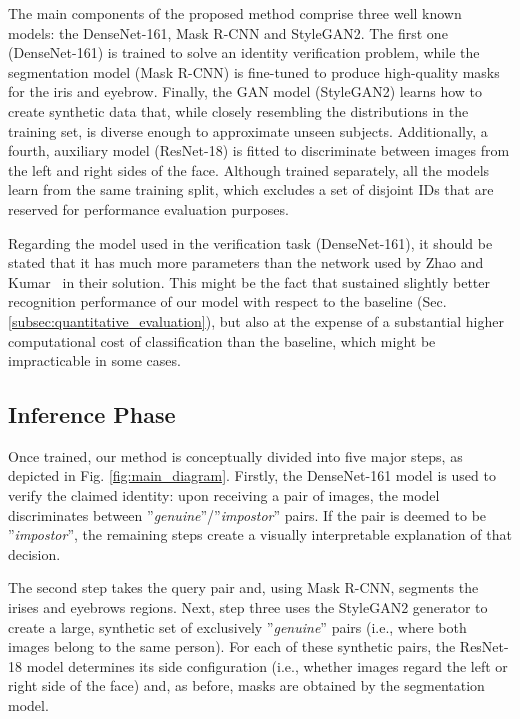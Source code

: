 \documentclass[final]{cvpr}
\begin{document}
The main components of the proposed method comprise three well known models: the DenseNet-161, Mask R-CNN and StyleGAN2. The first one (DenseNet-161) is trained to solve an identity verification problem, while the segmentation model (Mask R-CNN) is fine-tuned to produce high-quality masks for the iris and eyebrow. Finally, the GAN model (StyleGAN2) learns how to create synthetic data that, while closely resembling the distributions in the training set, is diverse enough to approximate unseen subjects. Additionally, a fourth, auxiliary model (ResNet-18) is fitted to discriminate between images from the left and right sides of the face. Although trained separately, all the models learn from the same training split, which excludes a set of disjoint IDs that are reserved for performance evaluation purposes.

Regarding the model used in the verification task (DenseNet-161), it should be stated that it has much more parameters than the network used by Zhao and Kumar~\cite{accurate_periocular_recognition} in their solution. This might be the fact that sustained slightly better recognition performance of our model with respect to the baseline (Sec. \ref{subsec:quantitative_evaluation}), but also at the expense of a substantial higher computational cost of classification than the baseline, which might be impracticable in some cases.

\subsection{Inference Phase}
\label{subsec:inference}

Once trained, our method is conceptually divided into five major steps, as depicted in Fig. \ref{fig:main_diagram}. Firstly, the DenseNet-161 model is used to verify the claimed identity: upon receiving a pair of images, the model discriminates  between ''\emph{genuine}''/''\emph{impostor}'' pairs. If the pair is deemed to be ''\emph{impostor}'', the remaining steps create a visually interpretable explanation of that decision.

The second step takes the query pair and, using Mask R-CNN, segments the irises and eyebrows regions. Next, step three uses the StyleGAN2 generator to create a large, synthetic set of exclusively ''\emph{genuine}'' pairs (i.e., where both images belong to the same person). For each of these synthetic pairs, the ResNet-18 model determines its side configuration (i.e., whether images regard the left or right side of the face) and, as before, masks are obtained by the segmentation model. 
\end{document}
